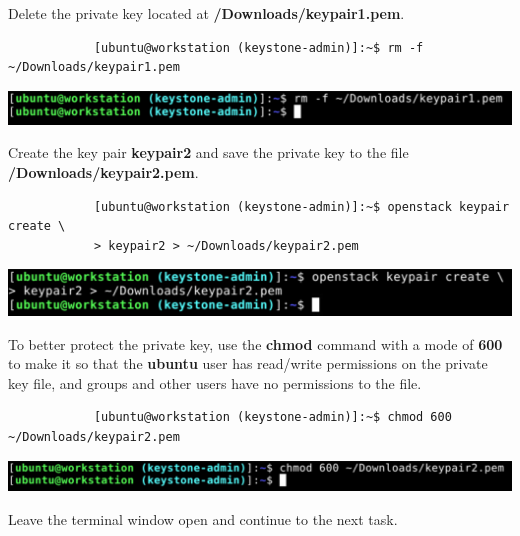 \documentclass[letterpaper, 12pt]{article}
\begin{document}
\begin{enumerate}
    \begin{labstep}
        Delete the private key located at \textbf{\texttildemid/Downloads/keypair1.pem}.
        \begin{lstlisting}
            [ubuntu@workstation (keystone-admin)]:~$ rm -f ~/Downloads/keypair1.pem
        \end{lstlisting}

        \begin{center}
            \includegraphics[width=\linewidth]{images/part4/step6.png}
        \end{center}
    \end{labstep}

    \begin{labstep}
        Create the key pair \textbf{keypair2} and save the private key to the file
        \textbf{\texttildemid/Downloads/keypair2.pem}.
        \begin{lstlisting}
            [ubuntu@workstation (keystone-admin)]:~$ openstack keypair create \
            > keypair2 > ~/Downloads/keypair2.pem
        \end{lstlisting}

        \begin{center}
            \includegraphics[width=\linewidth]{images/part4/step7.png}
        \end{center}
    \end{labstep}

    \begin{labstep}
        To better protect the private key, use the \textbf{chmod} command with a mode of \textbf{600} to make it so that the \textbf{ubuntu} user has read/write permissions on the private key file, and groups and other users have no permissions to the file.
        \begin{lstlisting}
            [ubuntu@workstation (keystone-admin)]:~$ chmod 600 ~/Downloads/keypair2.pem
        \end{lstlisting}

        \begin{center}
            \includegraphics[width=\linewidth]{images/part4/step8.png}
        \end{center}
    \end{labstep}

    \begin{labstep}
        Leave the terminal window open and continue to the next task.
    \end{labstep}

\end{enumerate}
\end{document}
